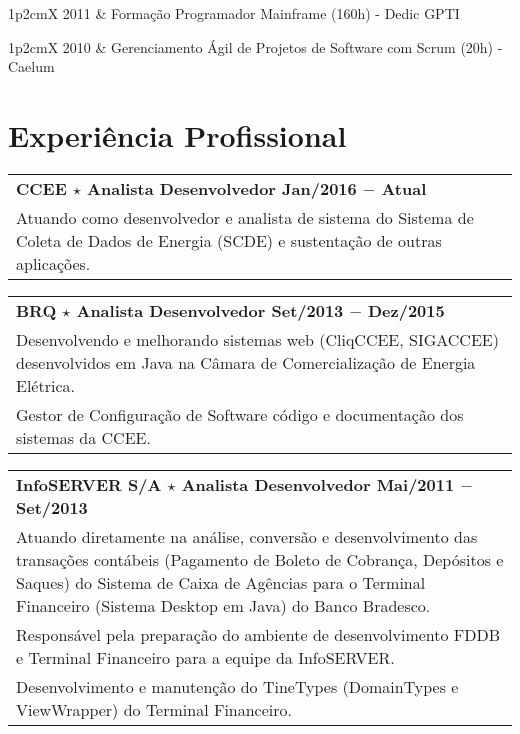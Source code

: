 \documentclass[a4paper, oneside, final]{scrartcl}
\newcommand{\vspc}{\vspace{0.15cm}} %
\newcommand{\vspcitem}{\vspace{0.1cm}} %
\begin{document}
\begin{center}
\begin{tabularx}{1\linewidth}{p{2cm}X}
2011       & Formação Programador Mainframe (160h) - Dedic GPTI \vspcitem\\
\end{tabularx}

\begin{tabularx}{1\linewidth}{p{2cm}X}
2010       & Gerenciamento Ágil de Projetos de Software com Scrum (20h) - Caelum
\end{tabularx}

\section{Experiência Profissional}
\begin{tabularx}{1\linewidth}{X}
{\bf CCEE $\star$ Analista Desenvolvedor \hfill Jan/2016 $-$ Atual} \\
Atuando como desenvolvedor e analista de sistema do Sistema de Coleta de Dados de Energia (SCDE) e sustentação de outras aplicações. \vspc\\
\end{tabularx}

\begin{tabularx}{1\linewidth}{X}
{\bf BRQ $\star$ Analista Desenvolvedor \hfill Set/2013 $-$ Dez/2015} \\
Desenvolvendo e melhorando sistemas web (CliqCCEE, SIGACCEE) desenvolvidos em Java na Câmara de Comercialização de Energia Elétrica. \vspc\\
Gestor de Configuração de Software código e documentação dos sistemas da CCEE. \vspc\\
\end{tabularx}

\begin{tabularx}{1\linewidth}{X}
{\bf InfoSERVER S/A $\star$ Analista Desenvolvedor \hfill Mai/2011 $-$ Set/2013} \\
Atuando diretamente na análise, conversão e desenvolvimento das transações contábeis (Pagamento de
Boleto de Cobrança, Depósitos e Saques) do Sistema de Caixa de Agências para o Terminal Financeiro (Sistema
Desktop em Java) do Banco Bradesco.\vspc\\
Responsável pela preparação do ambiente de desenvolvimento FDDB e Terminal Financeiro para a equipe da
InfoSERVER. \vspc\\
Desenvolvimento e manutenção do TineTypes (DomainTypes e ViewWrapper) do Terminal Financeiro.  \vspc\\
\end{tabularx}


\end{center}
\end{document}
